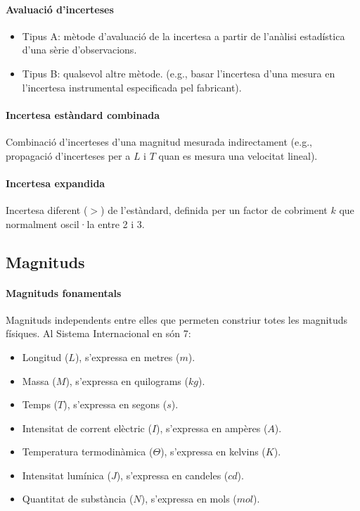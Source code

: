\paragraph{Avaluació d'incerteses}
\begin{itemize}
    \item Tipus A: mètode d'avaluació de la incertesa a partir de l'anàlisi estadística d'una sèrie d'observacions.
    \item Tipus B: qualsevol altre mètode. (e.g., basar l'incertesa d'una mesura en l'incertesa instrumental especificada pel fabricant).
\end{itemize}

\paragraph{Incertesa estàndard combinada}
Combinació d'incerteses d'una magnitud mesurada indirectament (e.g., propagació d'incerteses per a $L$ i $T$ quan es mesura una velocitat lineal).

\paragraph{Incertesa expandida}
Incertesa diferent ($>$) de l'estàndard, definida per un factor de cobriment $k$ que normalment oscil·la entre 2 i 3.

\subsection{Magnituds}
\paragraph{Magnituds fonamentals}
Magnituds independents entre elles que permeten constriur totes les magnituds físiques. Al Sistema Internacional en són 7:
\begin{itemize}
    \item Longitud ($L$), s'expressa en metres ($m$).
    \item Massa ($M$), s'expressa en quilograms ($kg$).
    \item Temps ($T$), s'expressa en segons ($s$).
    \item Intensitat de corrent elèctric ($I$), s'expressa en ampères ($A$).
    \item Temperatura termodinàmica ($\Theta$), s'expressa en kelvins ($K$).
    \item Intensitat lumínica ($J$), s'expressa en candeles ($cd$).
    \item Quantitat de substància ($N$), s'expressa en mols ($mol$).
\end{itemize}

